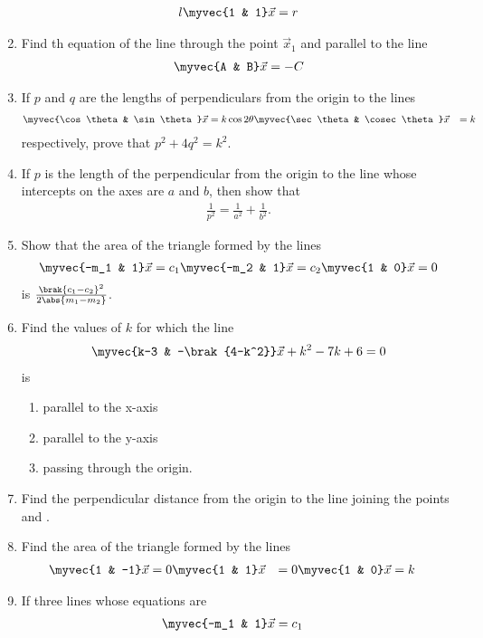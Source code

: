 \begin{enumerate}[label=\arabic*.,ref=\thesubsection.\theenumi]
\begin{align}
l\myvec{1 & 1}\vec{x} = r
\end{align}
%
\item Find th equation of the line through the point $\vec{x}_1$ and parallel to the line
%
\begin{align}
\myvec{A & B}\vec{x} = -C
\end{align}
%
\item If $p$ and $q$ are the lengths of perpendiculars from the origin to the lines 
%
\begin{align}
\myvec{\cos\theta & \sin\theta}\vec{x} &= k\cos2\theta

\myvec{\sec\theta & \cosec\theta}\vec{x} &= k
\end{align}
%
respectively, prove that $p^2+4q^2=k^2$.
\item If $p$ is the length of the perpendicular from the origin to the line whose intercepts on the axes are $a$ and $b$, then show that 
%
\begin{align}
\frac{1}{p^2} = \frac{1}{a^2}+\frac{1}{b^2}.
\end{align}
%
\item Show that the area of the triangle formed by the lines
%
\begin{align}
\myvec{-m_1 & 1}\vec{x} = c_1

\myvec{-m_2 & 1}\vec{x} = c_2

\myvec{1 & 0}\vec{x} = 0
\end{align}
%
is $\frac{\brak{c_1-c_2}^2}{2\abs{m_1-m_2}}$.
\item Find the values of $k$ for which the line 
%
\begin{align}
\myvec{k-3 & -\brak{4-k^2}}\vec{x} +k^2-7k+6= 0
\end{align}
%
is
\begin{enumerate}
\item parallel to the x-axis
\item parallel to the y-axis
\item passing through the origin.
\end{enumerate}
%
\item Find the perpendicular distance from the origin to the line joining the points \myvec{\cos\theta\sin\theta} and \myvec{\cos\phi \sin \phi}.
\item Find the area of the triangle formed by the lines
%
\begin{align}
\myvec{1 & -1}\vec{x} &= 0

\myvec{1 & 1}\vec{x} &= 0

\myvec{1 & 0}\vec{x} &= k
\end{align}
%
\item If three lines whose equations are 
%
\begin{align}
\myvec{-m_1 & 1}\vec{x} &= c_1


\end{align}
\end{enumerate}
